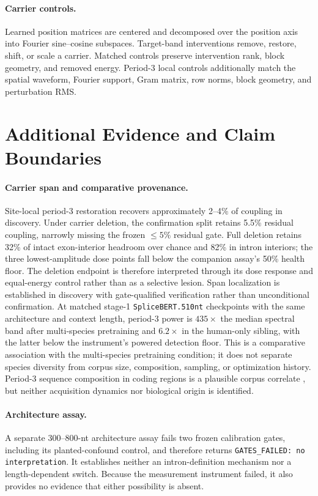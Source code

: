 \documentclass{article}
\begin{document}
\paragraph{Carrier controls.}
Learned position matrices are centered and decomposed over the position axis into Fourier sine--cosine subspaces. Target-band interventions remove, restore, shift, or scale a carrier. Matched controls preserve intervention rank, block geometry, and removed energy. Period-3 local controls additionally match the spatial waveform, Fourier support, Gram matrix, row norms, block geometry, and perturbation RMS.

\section{Additional Evidence and Claim Boundaries}
\label{app:scope}

\paragraph{Carrier span and comparative provenance.}
Site-local period-3 restoration recovers approximately 2--4\% of coupling in discovery. Under carrier deletion, the confirmation split retains 5.5\% residual coupling, narrowly missing the frozen \(\leq5\%\) residual gate. Full deletion retains 32\% of intact exon-interior headroom over chance and 82\% in intron interiors; the three lowest-amplitude dose points fall below the companion assay's 50\% health floor. The deletion endpoint is therefore interpreted through its dose response and equal-energy control rather than as a selective lesion. Span localization is established in discovery with gate-qualified verification rather than unconditional confirmation. At matched stage-1 \texttt{SpliceBERT.510nt} checkpoints with the same architecture and context length, period-3 power is \(435\times\) the median spectral band after multi-species pretraining and \(6.2\times\) in the human-only sibling, with the latter below the instrument's powered detection floor. This is a comparative association with the multi-species pretraining condition; it does not separate species diversity from corpus size, composition, sampling, or optimization history. Period-3 sequence composition in coding regions is a plausible corpus correlate \citep{tiwari1997period3,yin2005fourier}, but neither acquisition dynamics nor biological origin is identified.

\paragraph{Architecture assay.}
A separate 300--800-nt architecture assay fails two frozen calibration gates, including its planted-confound control, and therefore returns \texttt{GATES\_FAILED: no interpretation}. It establishes neither an intron-definition mechanism nor a length-dependent switch. Because the measurement instrument failed, it also provides no evidence that either possibility is absent.
\end{document}
